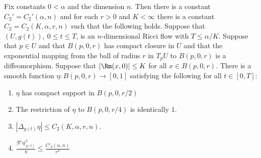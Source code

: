 \begin{proposition}\label{prop:parabolic-cutoff-function}
\label{etaprop}

Fix constants $0<\alpha$ and the dimension $n$. Then there is a constant
$C_2'=C_2'(\alpha,n)$ and for each $r>0$ and $K<\infty$ there is a constant
$C_2=C_2(K,\alpha,r,n)$ such that the following holds. Suppose that $(U,g(t)),\
0\le t\le T$,  is an $n$-dimensional Ricci flow  with $T\le \alpha/K$. Suppose
that $p\in U$ and that $B(p,0,r)$ has compact closure in $U$ and that the
exponential mapping from the ball of radius $r$ in $T_pU$ to $B(p,0,r)$ is a
diffeomorphism. Suppose that $|\Rm(x,0)|\le K$ for all $x\in B(p,0,r)$. There is
a smooth function $\eta\colon B(p,0,r)\to [0,1]$ satisfying the following for
all $t\in [0,T]$:
\begin{enumerate}
\item $\eta$ has compact support in $B(p,0,r/2)$
\item The restriction of $\eta$ to $B(p,0,r/4)$ is identically $1$.
\item $|\Delta_{g(t)} \eta|\le C_2(K,\alpha,r,n)$.
\item $\frac{|\nabla \eta|_{g(t)}^2}{\eta}\le \frac{C'_2(\alpha,n)}{r^2}$
\end{enumerate}
\end{proposition}

